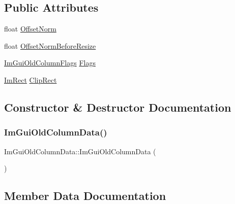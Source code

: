 \subsection*{Public Attributes}
\begin{DoxyCompactItemize}
\item 
float \hyperlink{structImGuiOldColumnData_a87f711016d4006d7fb9fa21815fe6f8f}{Offset\+Norm}
\item 
float \hyperlink{structImGuiOldColumnData_aacf1574d1907c9afaadd5a702d6803ef}{Offset\+Norm\+Before\+Resize}
\item 
\hyperlink{imgui__internal_8h_a930931ec4c54582a278a461676df4dda}{Im\+Gui\+Old\+Column\+Flags} \hyperlink{structImGuiOldColumnData_ac31f2d6cf8d454163d2d5c46b7cb16ad}{Flags}
\item 
\hyperlink{structImRect}{Im\+Rect} \hyperlink{structImGuiOldColumnData_a2eef22c9f568b9020ee0f6ec682b1415}{Clip\+Rect}
\end{DoxyCompactItemize}


\subsection{Constructor \& Destructor Documentation}
\mbox{\label{structImGuiOldColumnData_a6fd70ab5181a2615ac83ffb7813b31e3}} 
\subsubsection{\texorpdfstring{Im\+Gui\+Old\+Column\+Data()}{ImGuiOldColumnData()}}
{\footnotesize\ttfamily Im\+Gui\+Old\+Column\+Data\+::\+Im\+Gui\+Old\+Column\+Data (\begin{DoxyParamCaption}{ }\end{DoxyParamCaption})\hspace{0.3cm}{\ttfamily [inline]}}



\subsection{Member Data Documentation}
\mbox{\label{structImGuiOldColumnData_a2eef22c9f568b9020ee0f6ec682b1415}} 
